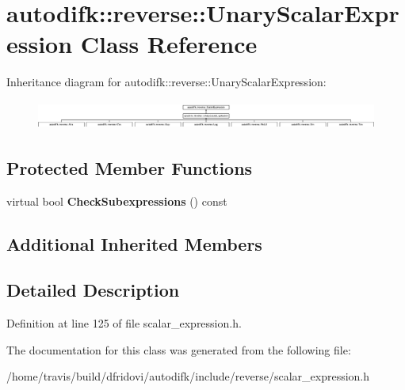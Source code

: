 \hypertarget{classautodifk_1_1reverse_1_1_unary_scalar_expression}{\section{autodifk\-:\-:reverse\-:\-:Unary\-Scalar\-Expression Class Reference}
\label{classautodifk_1_1reverse_1_1_unary_scalar_expression}
}
Inheritance diagram for autodifk\-:\-:reverse\-:\-:Unary\-Scalar\-Expression\-:\begin{figure}[H]
\begin{center}
\leavevmode
\includegraphics[height=0.948617cm]{classautodifk_1_1reverse_1_1_unary_scalar_expression}
\end{center}
\end{figure}
\subsection*{Protected Member Functions}
\begin{DoxyCompactItemize}
\item 
\hypertarget{classautodifk_1_1reverse_1_1_unary_scalar_expression_a6333034cd7c8e1aa887746161908c390}{virtual bool {\bfseries Check\-Subexpressions} () const }\label{classautodifk_1_1reverse_1_1_unary_scalar_expression_a6333034cd7c8e1aa887746161908c390}

\end{DoxyCompactItemize}
\subsection*{Additional Inherited Members}


\subsection{Detailed Description}


Definition at line 125 of file scalar\-\_\-expression.\-h.



The documentation for this class was generated from the following file\-:\begin{DoxyCompactItemize}
\item 
/home/travis/build/dfridovi/autodifk/include/reverse/scalar\-\_\-expression.\-h\end{DoxyCompactItemize}
